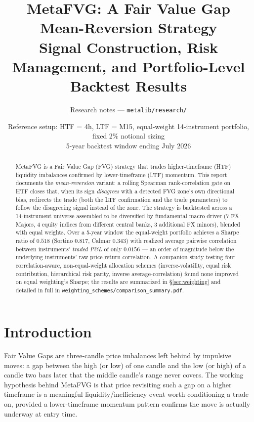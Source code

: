 \documentclass[11pt]{article}
\title{\vspace{-1.5em}MetaFVG: A Fair Value Gap Mean-Reversion Strategy\\[4pt]
\large Signal Construction, Risk Management, and Portfolio-Level Backtest Results}
\author{Research notes --- \texttt{metalib/research/}}
\date{Reference setup: HTF = 4h, LTF = M15, equal-weight 14-instrument portfolio, fixed 2\% notional sizing\\
5-year backtest window ending July 2026}
\begin{document}
\maketitle
\vspace{-1em}

\begin{abstract}
\noindent MetaFVG is a Fair Value Gap (FVG) strategy that trades higher-timeframe (HTF) liquidity
imbalances confirmed by lower-timeframe (LTF) momentum. This report documents the
\emph{mean-reversion} variant: a rolling Spearman rank-correlation gate on HTF closes that, when its
sign \emph{disagrees} with a detected FVG zone's own directional bias, redirects the trade (both the
LTF confirmation and the trade parameters) to follow the disagreeing signal instead of the zone. The
strategy is backtested across a 14-instrument universe assembled to be diversified by fundamental
macro driver (7 FX Majors, 4 equity indices from different central banks, 3 additional FX minors),
blended with equal weights. Over a 5-year window the equal-weight portfolio achieves a Sharpe ratio
of $0.518$ (Sortino $0.817$, Calmar $0.343$) with realized average pairwise correlation between
instruments' \emph{traded P\&L} of only $0.0156$ --- an order of magnitude below the underlying
instruments' raw price-return correlation. A companion study testing four correlation-aware,
non-equal-weight allocation schemes (inverse-volatility, equal risk contribution, hierarchical risk
parity, inverse average-correlation) found none improved on equal weighting's Sharpe; the results are
summarized in \S\ref{sec:weighting} and detailed in full in \texttt{weighting\_schemes/comparison\_summary.pdf}.
\end{abstract}

\tableofcontents

\section{Introduction}
Fair Value Gaps are three-candle price imbalances left behind by impulsive moves: a gap between the
high (or low) of one candle and the low (or high) of a candle two bars later that the middle candle's
range never covers. The working hypothesis behind MetaFVG is that price revisiting such a gap on a
higher timeframe is a meaningful liquidity/inefficiency event worth conditioning a trade on, provided
a lower-timeframe momentum pattern confirms the move is actually underway at entry time.
\end{document}
